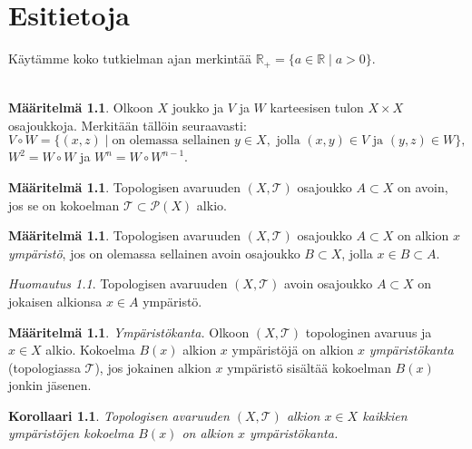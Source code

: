 \documentclass[12pt,a4paper,leqno]{report}
\newcommand{\R}{\mathbb{R}}
\newcommand{\T}{\mathcal{T}}
\newcommand{\Pot}{\mathcal{P}}
\theoremstyle{plain}
\newtheorem{kor}[equation]{Korollaari}
\theoremstyle{definition}
\newtheorem{maar}[equation]{Määritelmä}
\theoremstyle{remark}
\newtheorem{huom}[equation]{Huomautus}
\begin{document}
\chapter{Esitietoja}
Käytämme koko tutkielman ajan merkintää $\R_+=\{a\in\R\mid a>0\}$.
\\
\\
\begin{maar}
Olkoon $X$ joukko ja $V$ ja $W$ karteesisen tulon $X\times X$ osajoukkoja.
Merkitään tällöin %
seuraavasti: 
$$V\circ W=\{(x,z)\mid \text{on olemassa sellainen }y \in X,\text{ jolla }(x,y)\in V\text{ ja }(y,z)\in W\},$$ 
$W^2=W\circ W$ ja $W^n=W\circ W^{n-1}$.
\end{maar}
\begin{maar}
Topologisen avaruuden $(X,\T)$ osajoukko $A\subset X$ on avoin, 
jos se on kokoelman $\T\subset\Pot(X)$ alkio.
\end{maar}
\begin{maar}%
Topologisen avaruuden $(X,\T)$ 
osa\-jouk\-ko $A\subset X$ on alkion $x$ \emph{ympäristö}, 
jos on olemassa sellainen avoin osajoukko $B\subset X $, jolla $x\in B\subset A$.
\end{maar}
\begin{huom}
Topologisen avaruuden $(X,\T)$ avoin osajoukko $A\subset X$ on 
jokaisen alkionsa $x\in A$ ympäristö.
\end{huom}
\begin{maar}%
\emph{Ympäristökanta.} 
Olkoon $(X,\T)$ topologinen avaruus ja $x\in X$ alkio. 
Kokoelma $B(x)$ alkion $x$ ympäristöjä on alkion $x$ \emph{ympäristökanta} 
(topologiassa $\T$), jos jokainen alkion $x$ ympäristö sisältää 
kokoelman $B(x)$ jonkin jäsenen. 
\end{maar}
\begin{kor}\label{kaikki_ystöt}
Topologisen avaruuden $(X,\T)$ alkion $x\in X$ kaikkien ympäristöjen kokoelma $B(x)$ on alkion $x$ ympäristökanta.
\end{kor}
\end{document}
